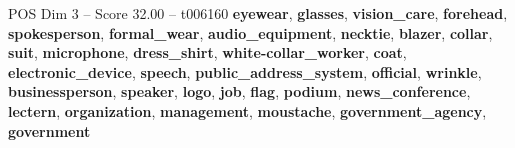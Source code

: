 \begin{textsample}{POS Dim 3 – Score 32.00 – t006160}  \label{ex:f3_pos_004}
\textbf{eyewear}, \textbf{glasses}, \textbf{vision\_care}, \textbf{forehead}, \textbf{spokesperson}, \textbf{formal\_wear}, \textbf{audio\_equipment}, \textbf{necktie}, \textbf{blazer}, \textbf{collar}, \textbf{suit}, \textbf{microphone}, \textbf{dress\_shirt}, \textbf{white-collar\_worker}, \textbf{coat}, \textbf{electronic\_device}, \textbf{speech}, \textbf{public\_address\_system}, \textbf{official}, \textbf{wrinkle}, \textbf{businessperson}, \textbf{speaker}, \textbf{logo}, \textbf{job}, \textbf{flag}, \textbf{podium}, \textbf{news\_conference}, \textbf{lectern}, \textbf{organization}, \textbf{management}, \textbf{moustache}, \textbf{government\_agency}, \textbf{government}

\end{textsample}
